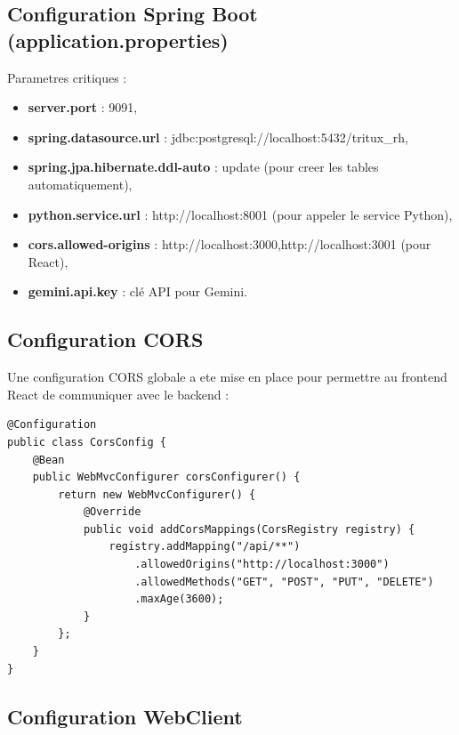 \subsection{Configuration Spring Boot (application.properties)}

Parametres critiques :

\begin{itemize}
    \item \textbf{server.port} : 9091,
    
    \item \textbf{spring.datasource.url} : jdbc:postgresql://localhost:5432/tritux\_rh,
    
    \item \textbf{spring.jpa.hibernate.ddl-auto} : update (pour creer les tables automatiquement),
    
    \item \textbf{python.service.url} : http://localhost:8001 (pour appeler le service Python),
    
    \item \textbf{cors.allowed-origins} : http://localhost:3000,http://localhost:3001 (pour React),
    
    \item \textbf{gemini.api.key} : clé API pour Gemini.
\end{itemize}

\subsection{Configuration CORS}

Une configuration CORS globale a ete mise en place pour permettre au frontend React de communiquer avec le backend :

\begin{verbatim}
@Configuration
public class CorsConfig {
    @Bean
    public WebMvcConfigurer corsConfigurer() {
        return new WebMvcConfigurer() {
            @Override
            public void addCorsMappings(CorsRegistry registry) {
                registry.addMapping("/api/**")
                    .allowedOrigins("http://localhost:3000")
                    .allowedMethods("GET", "POST", "PUT", "DELETE")
                    .maxAge(3600);
            }
        };
    }
}
\end{verbatim}

\subsection{Configuration WebClient}

